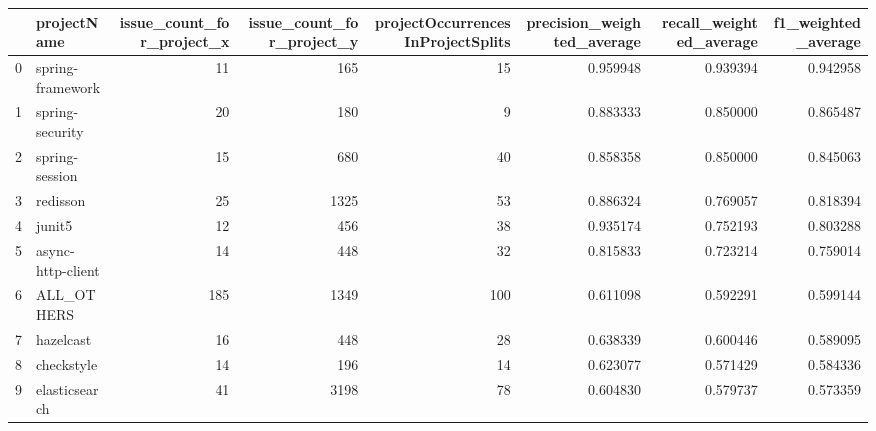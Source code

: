 \begin{tabular}{llrrrrrr}
\toprule
{} &        projectName &  issue\_count\_for\_project\_x &  issue\_count\_for\_project\_y &  projectOccurrencesInProjectSplits &  precision\_weighted\_average &  recall\_weighted\_average &  f1\_weighted\_average \\
\midrule
0  &   spring-framework &                         11 &                        165 &                                 15 &                    0.959948 &                 0.939394 &             0.942958 \\
1  &    spring-security &                         20 &                        180 &                                  9 &                    0.883333 &                 0.850000 &             0.865487 \\
2  &     spring-session &                         15 &                        680 &                                 40 &                    0.858358 &                 0.850000 &             0.845063 \\
3  &           redisson &                         25 &                       1325 &                                 53 &                    0.886324 &                 0.769057 &             0.818394 \\
4  &             junit5 &                         12 &                        456 &                                 38 &                    0.935174 &                 0.752193 &             0.803288 \\
5  &  async-http-client &                         14 &                        448 &                                 32 &                    0.815833 &                 0.723214 &             0.759014 \\
6  &         ALL\_OTHERS &                        185 &                       1349 &                                100 &                    0.611098 &                 0.592291 &             0.599144 \\
7  &          hazelcast &                         16 &                        448 &                                 28 &                    0.638339 &                 0.600446 &             0.589095 \\
8  &         checkstyle &                         14 &                        196 &                                 14 &                    0.623077 &                 0.571429 &             0.584336 \\
9  &      elasticsearch &                         41 &                       3198 &                                 78 &                    0.604830 &                 0.579737 &             0.573359 \\

\end{tabular}
